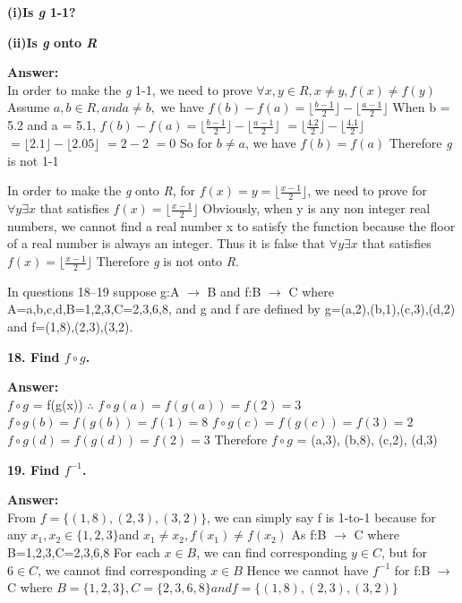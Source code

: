 \documentclass{article}
\begin{document}
\begin{large}
\textbf{(i)Is \emph{g} 1-1?}

\textbf{(ii)Is \emph{g} onto \emph{R}}

\textbf{Answer:} \\

In order to make the \emph{g} 1-1, we need to prove $\forall x, y \in R, x \neq y, f(x) \neq f(y)$
Assume $a, b \in R, and a \neq b,$ we have
$f(b) - f(a) = \lfloor \frac{b-1}{2} \rfloor - \lfloor \frac{a-1}{2} \rfloor$
When b = 5.2 and a = 5.1, 
$f(b) - f(a) = \lfloor \frac{b-1}{2} \rfloor - \lfloor \frac{a-1}{2} \rfloor$
            $= \lfloor \frac{4.2}{2} \rfloor - \lfloor \frac{4.1}{2} \rfloor$
            $= \lfloor 2.1 \rfloor - \lfloor 2.05 \rfloor$
            $= 2 - 2$
            $= 0$
So for $b \neq a$, we have $f(b) = f(a)$
Therefore \emph{g} is not 1-1

In order to make the \emph{g} onto \emph{R}, 
for $f(x) = y = \lfloor \frac{x-1}{2}\rfloor$, we need to prove for $\forall y \exists x$ that satisfies $f(x) = \lfloor \frac{x-1}{2}\rfloor$
Obviously, when y is any non integer real numbers, we cannot find a real number x to satisfy the function because the floor of a real number is always an integer.
Thus it is false that $\forall y \exists x$ that satisfies $f(x) = \lfloor \frac{x-1}{2}\rfloor$
Therefore \emph{g} is not onto \emph{R}.


In questions 18–19 suppose g:A $\to$ B and f:B $\to$ C where A={a,b,c,d},B={1,2,3},C={2,3,6,8}, and g and f are defined by g={(a,2),(b,1),(c,3),(d,2)} and f={(1,8),(2,3),(3,2)}.

\textbf{18. Find $f\circ g$.}

\textbf{Answer:} \\

$f \circ g$ = f(g(x))
$\therefore$ $f \circ g(a) = f(g(a)) = f(2) = 3$
             $f \circ g(b) = f(g(b)) = f(1) = 8$
             $f \circ g(c) = f(g(c)) = f(3) = 2$
             $f \circ g(d) = f(g(d)) = f(2) = 3$
Therefore $f \circ g$ = {(a,3), (b,8), (c,2), (d,3)}


\textbf{19. Find $f^{-1}$.}

\textbf{Answer:} \\

From $f=\{(1,8),(2,3),(3,2)\}$, we can simply say f is 1-to-1 because for any $x_{1}, x_{2} \in \{1,2,3\} $and $x_{1} \neq x_{2}, f(x_{1}) \neq f(x_{2})$
As f:B $\to$ C where B={1,2,3},C={2,3,6,8}
For each $x \in B$, we can find corresponding $y \in C$, but for $6 \in C$, we cannot find corresponding $x \in B$
Hence we cannot have $f^{-1}$ for f:B $\to$ C where $B=\{1,2,3\},C=\{2,3,6,8\} and f=\{(1,8),(2,3),(3,2)\}$


\end{large}
\end{document}
